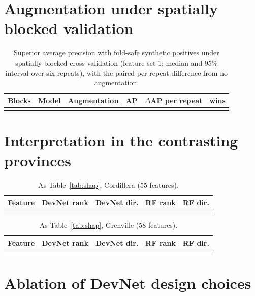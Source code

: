 \documentclass[pdflatex,sn-apa]{sn-jnl}
\begin{document}
\begin{appendices}
\clearpage
\section{Augmentation under spatially blocked validation}\label{app:aug-spatial}

\begin{table}[!h]
\caption{Superior average precision with fold-safe synthetic positives under spatially blocked cross-validation (feature set 1; median and 95\% interval over six repeats), with the paired per-repeat difference from no augmentation.}\label{tab:aug-spatial}
\footnotesize
\begin{tabular*}{\textwidth}{@{\extracolsep\fill}lllccc}
\toprule
Blocks & Model & Augmentation & AP & $\Delta$AP per repeat & wins \\
\midrule
\botrule
\end{tabular*}
\end{table}

\clearpage
\section{Interpretation in the contrasting provinces}\label{app:shap}

\begin{table}[!h]
\caption{As Table~\ref{tab:shap}, Cordillera (55 features).}\label{tab:shap-cord}
\footnotesize
\begin{tabular*}{\textwidth}{@{\extracolsep\fill}lcccc}
\toprule
Feature & DevNet rank & DevNet dir. & RF rank & RF dir. \\
\midrule
\botrule
\end{tabular*}
\end{table}

\begin{table}[!h]
\caption{As Table~\ref{tab:shap}, Grenville (58 features).}\label{tab:shap-gren}
\footnotesize
\begin{tabular*}{\textwidth}{@{\extracolsep\fill}lcccc}
\toprule
Feature & DevNet rank & DevNet dir. & RF rank & RF dir. \\
\midrule
\botrule
\end{tabular*}
\end{table}

\clearpage
\section{Ablation of DevNet design choices}\label{app:sensitivity}


\end{appendices}
\end{document}
